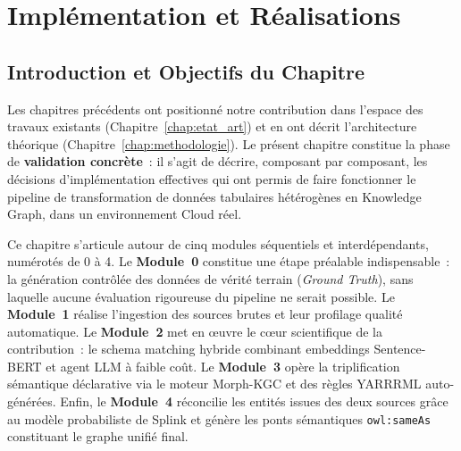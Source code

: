 \chapter{Implémentation et Réalisations}
\label{chap:implementation}

\section{Introduction et Objectifs du Chapitre}
\label{sec:chap3_intro}

Les chapitres précédents ont positionné notre contribution dans l'espace
des travaux existants (Chapitre~\ref{chap:etat_art}) et en ont décrit
l'architecture théorique (Chapitre~\ref{chap:methodologie}). Le présent
chapitre constitue la phase de \textbf{validation concrète}~: il s'agit
de décrire, composant par composant, les décisions d'implémentation
effectives qui ont permis de faire fonctionner le pipeline de
transformation de données tabulaires hétérogènes en Knowledge Graph,
dans un environnement Cloud réel.

Ce chapitre s'articule autour de cinq modules séquentiels et
interdépendants, numérotés de 0 à 4. Le \textbf{Module~0} constitue une
étape préalable indispensable~: la génération contrôlée des données de
vérité terrain (\textit{Ground Truth}), sans laquelle aucune évaluation
rigoureuse du pipeline ne serait possible. Le \textbf{Module~1}
réalise l'ingestion des sources brutes et leur profilage qualité
automatique. Le \textbf{Module~2} met en œuvre le cœur scientifique de
la contribution~: le schema matching hybride combinant embeddings
Sentence-BERT et agent LLM à faible coût. Le \textbf{Module~3}
opère la triplification sémantique déclarative via le moteur
Morph-KGC et des règles YARRRML auto-générées. Enfin, le
\textbf{Module~4} réconcilie les entités issues des deux sources grâce
au modèle probabiliste de Splink et génère les ponts sémantiques
\texttt{owl:sameAs} constituant le graphe unifié final.

